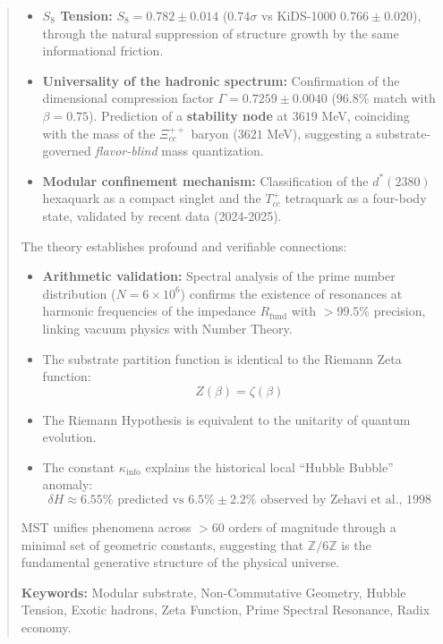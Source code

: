 \documentclass[11pt, a4paper]{article}
\theoremstyle{plain}
\theoremstyle{definition}
\newcommand{\Rfactor}{R_{\text{fund}}}
\newcommand{\Kinfo}{\kappa_{\text{info}}}
\begin{document}
\begin{abstract}
\begin{itemize}
    \item \textbf{$S_8$ Tension:} $S_8 = 0.782 \pm 0.014$ ($0.74\sigma$ vs KiDS-1000 $0.766 \pm 0.020$), through the natural suppression of structure growth by the same informational friction.
    
    \item \textbf{Universality of the hadronic spectrum:} Confirmation of the dimensional compression factor $\Gamma = 0.7259 \pm 0.0040$ ($96.8\%$ match with $\beta = 0.75$). Prediction of a \textbf{stability node} at $3619$ MeV, coinciding with the mass of the $\Xi_{cc}^{++}$ baryon ($3621$ MeV), suggesting a substrate-governed \textit{flavor-blind} mass quantization.
    
    \item \textbf{Modular confinement mechanism:} Classification of the $d^*(2380)$ hexaquark as a compact singlet and the $T_{cc}^+$ tetraquark as a four-body state, validated by recent data (2024-2025).
\end{itemize}

The theory establishes profound and verifiable connections:

\begin{itemize}
    \item \textbf{Arithmetic validation:} Spectral analysis of the prime number distribution ($N=6\times 10^6$) confirms the existence of resonances at harmonic frequencies of the impedance $\Rfactor$ with $>99.5\%$ precision, linking vacuum physics with Number Theory.
    \item The substrate partition function is identical to the Riemann Zeta function:
\[ Z(\beta) = \zeta(\beta) \]
    \item The Riemann Hypothesis is equivalent to the unitarity of quantum evolution.
    \item The constant $\Kinfo$ explains the historical local ``Hubble Bubble'' anomaly:
\[ \delta H \approx 6.55\% \text{ predicted vs } 6.5\% \pm 2.2\% \text{ observed by Zehavi et al., 1998} \]
\end{itemize}

MST unifies phenomena across $>60$ orders of magnitude through a minimal set of geometric constants, suggesting that $\mathbb{Z}/6\mathbb{Z}$ is the fundamental generative structure of the physical universe.

\vspace{0.5cm}
\noindent\textbf{Keywords:} Modular substrate, Non-Commutative Geometry, Hubble Tension, Exotic hadrons, Zeta Function, Prime Spectral Resonance, Radix economy.
\end{abstract}
\end{document}
